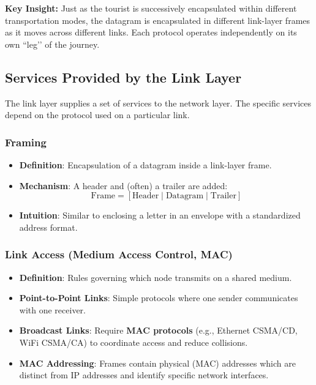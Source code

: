 \documentclass[12pt]{article}
\begin{document}
\noindent \textbf{Key Insight:}
Just as the tourist is successively encapsulated within different transportation modes, the datagram is encapsulated in different link-layer frames as it moves across different links. Each protocol operates independently on its own ``leg’’ of the journey.

\subsection{Services Provided by the Link Layer}

The link layer supplies a set of services to the network layer. The specific services depend on the protocol used on a particular link.

\subsubsection{Framing}

\begin{itemize}
    \item \textbf{Definition}: Encapsulation of a datagram inside a link-layer frame.
    \item \textbf{Mechanism}: A header and (often) a trailer are added:
          \[
              \text{Frame} = [\text{Header} \mid \text{Datagram} \mid \text{Trailer}]
          \]
    \item \textbf{Intuition}: Similar to enclosing a letter in an envelope with a standardized address format.
\end{itemize}

\subsubsection{Link Access (Medium Access Control, MAC)}

\begin{itemize}
    \item \textbf{Definition}: Rules governing which node transmits on a shared medium.
    \item \textbf{Point-to-Point Links}: Simple protocols where one sender communicates with one receiver.
    \item \textbf{Broadcast Links}: Require \textbf{MAC protocols} (e.g., Ethernet CSMA/CD, WiFi CSMA/CA) to coordinate access and reduce collisions.
    \item \textbf{MAC Addressing}: Frames contain physical (MAC) addresses which are distinct from IP addresses and identify specific network interfaces.
\end{itemize}
\end{document}

